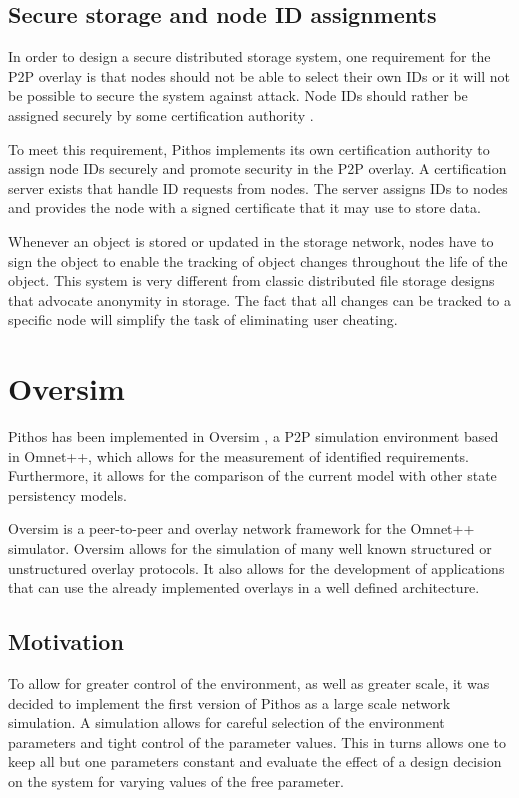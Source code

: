 \subsection{Secure storage and node ID assignments}
\label{secure_ids}

In order to design a secure distributed storage system, one requirement for the P2P overlay is that nodes should not be able to select their own IDs
or it will not be possible to secure the system against attack. Node IDs should rather be assigned securely by some certification authority
\cite{secure_overlay_routing}.

To meet this requirement, Pithos implements its own certification authority to assign node IDs securely and promote security in the P2P overlay. A
certification server exists that handle ID requests from nodes. The server assigns IDs to nodes and provides the node with a signed certificate that
it may use to store data.

Whenever an object is stored or updated in the storage network, nodes have to sign the object to enable the tracking of object changes throughout the
life of the object. This system is very different from classic distributed file storage designs that advocate anonymity in storage. The fact that all
changes can be tracked to a specific node will simplify the task of eliminating user cheating.

\section{Oversim}

Pithos has been implemented in Oversim \cite{OverSim_2007}, a P2P simulation environment based in Omnet++, which allows for the measurement of identified requirements. Furthermore, it allows for the comparison of the current model with other state persistency models.

Oversim is a peer-to-peer and overlay network framework for the Omnet++ simulator. Oversim allows for the simulation of many well known structured or unstructured overlay protocols. It also allows for the development of applications that can use the already implemented overlays in a well defined architecture.

    \subsection{Motivation}

To allow for greater control of the environment, as well as greater scale, it was decided to implement the first version of Pithos as a large scale network simulation. A simulation allows for careful selection of the environment parameters and tight control of the parameter values. This in turns allows one to keep all but one parameters constant and evaluate the effect of a design decision on the system for varying values of the free parameter.

